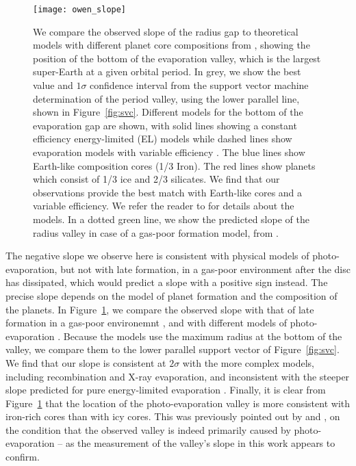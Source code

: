 \documentclass[a4paper,fleqn,usenatbib]{mnras}
\begin{document}
\begin{figure}
\texttt{[image: owen\_slope]}
	\caption{We compare the observed slope of the radius gap to theoretical models with different planet core compositions from \protect\cite{owen2017}, showing the position of the bottom of the evaporation valley, which is the largest super-Earth at a given orbital period. In grey, we show the best value and $1\sigma$ confidence interval from the support vector machine determination of the period valley, using the lower parallel line, shown in Figure~\protect\ref{fig:svc}. Different models for the bottom of the evaporation gap are shown, with solid lines showing a constant efficiency energy-limited (EL) models while dashed
lines show evaporation models with variable efficiency \protect\cite[VE, see e.g.][]{owen2012}. The blue lines show Earth-like composition cores (1/3 Iron). The red lines show planets which consist of 1/3 ice and 2/3 silicates. We find that our observations provide the best match with Earth-like cores and a variable efficiency. We refer the reader to \protect\cite{owen2017} for details about the models. In a dotted green line, we show the predicted slope of the radius valley in case of a gas-poor formation model, from \protect\cite{lopez2016}.
}
	\label{fig:theory}
\end{figure}


The negative slope we observe here is consistent with physical models of photo-evaporation, but not with late formation, in a gas-poor environment after the disc has dissipated, which would predict a slope with a positive sign instead. The precise slope depends on the model of planet formation and the composition of the planets. In Figure~\ref{fig:theory}, we compare the observed slope with that of late formation in a gas-poor environemnt \citep{lopez2016}, and with different models of photo-evaporation \cite{owen2017}. Because the models use the maximum radius at the bottom of the valley, we compare them to the lower parallel support vector of Figure~\ref{fig:svc}. We find that our slope is consistent at $2\sigma$ with the more complex models, including recombination and X-ray evaporation, and inconsistent with the steeper slope predicted for pure energy-limited evaporation \citep{owen2017}. Finally, it is clear from Figure~\ref{fig:theory} that the location of the photo-evaporation valley is more consistent with iron-rich cores than with icy cores. This was previously pointed out by \cite{owen2017} and \cite{jin2018}, on the condition that the observed valley is indeed primarily caused by photo-evaporation -- as the measurement of the valley's slope in this work appears to confirm.
\end{document}
